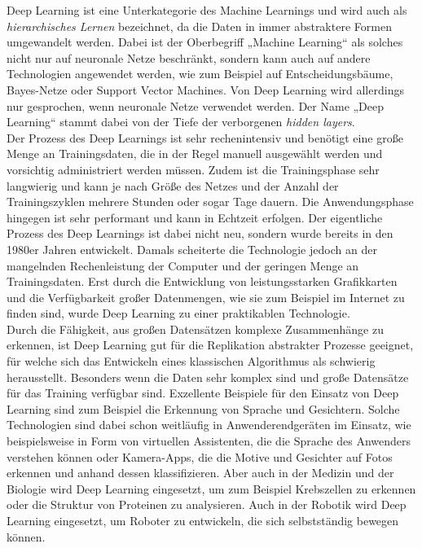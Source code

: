 \newpage

\noindent Deep Learning ist eine Unterkategorie des Machine Learnings und wird auch als \textit{hierarchisches Lernen} bezeichnet, da die Daten in immer abstraktere Formen umgewandelt werden. Dabei ist der Oberbegriff „Machine Learning“ als solches nicht nur auf neuronale Netze beschränkt, sondern kann auch auf andere Technologien angewendet werden, wie zum Beispiel auf Entscheidungsbäume, Bayes-Netze oder Support Vector Machines. Von Deep Learning wird allerdings nur gesprochen, wenn neuronale Netze verwendet werden. Der Name „Deep Learning“ stammt dabei von der Tiefe der verborgenen \textit{hidden layers}.\\

\noindent Der Prozess des Deep Learnings ist sehr rechenintensiv und benötigt eine große Menge an Trainingsdaten, die in der Regel manuell ausgewählt werden und vorsichtig administriert werden müssen. Zudem ist die Trainingsphase sehr langwierig und kann je nach Größe des Netzes und der Anzahl der Trainingszyklen mehrere Stunden oder sogar Tage dauern. Die Anwendungsphase hingegen ist sehr performant und kann in Echtzeit erfolgen. Der eigentliche Prozess des Deep Learnings ist dabei nicht neu, sondern wurde bereits in den 1980er Jahren entwickelt. Damals scheiterte die Technologie jedoch an der mangelnden Rechenleistung der Computer und der geringen Menge an Trainingsdaten. Erst durch die Entwicklung von leistungsstarken Grafikkarten und die Verfügbarkeit großer Datenmengen, wie sie zum Beispiel im Internet zu finden sind, wurde Deep Learning zu einer praktikablen Technologie. \\

\noindent Durch die Fähigkeit, aus großen Datensätzen komplexe Zusammenhänge zu erkennen, ist Deep Learning gut für die Replikation abstrakter Prozesse geeignet, für welche sich das Entwickeln eines klassischen Algorithmus als schwierig herausstellt. Besonders wenn die Daten sehr komplex sind und große Datensätze für das Training verfügbar sind. Exzellente Beispiele für den Einsatz von Deep Learning sind zum Beispiel die Erkennung von Sprache und Gesichtern. Solche Technologien sind dabei schon weitläufig in Anwenderendgeräten im Einsatz, wie beispielsweise in Form von virtuellen Assistenten, die die Sprache des Anwenders verstehen können oder Kamera-Apps, die die Motive und Gesichter auf Fotos erkennen und anhand dessen klassifizieren. Aber auch in der Medizin und der Biologie wird Deep Learning eingesetzt, um zum Beispiel Krebszellen zu erkennen oder die Struktur von Proteinen zu analysieren. Auch in der Robotik wird Deep Learning eingesetzt, um Roboter zu entwickeln, die sich selbstständig bewegen können. \\

\newpage